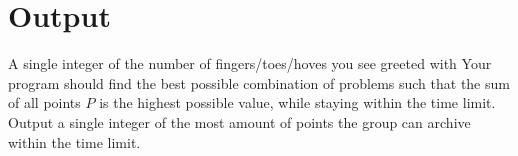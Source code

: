 \section*{Output}
A single integer of the number of fingers/toes/hoves you see greeted with
Your program should find the best possible combination of problems such that the sum of all points $P$ is the highest possible value, while staying within the time limit.
Output a single integer of the most amount of points the group can archive within the time limit.